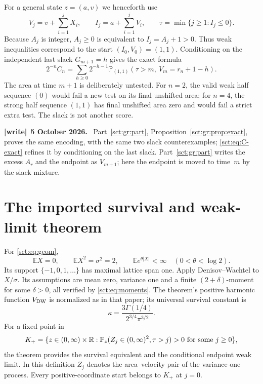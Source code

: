 \documentclass[11pt,letterpaper]{article}
\theoremstyle{definition}\newtheorem{remark}[theorem]{Remark}
\newcommand{\Pp}{\mathbb P}\newcommand{\Ee}{\mathbb E}
\newenvironment{writenote}[1][]{\par\smallskip\begingroup\small
 \noindent\textbf{[write]}\if\relax\detokenize{#1}\relax\else~\textbf{#1.}\fi\ }%
 {\par\endgroup\smallskip}
\begin{document}
For a general state $z=(a,v)$ we henceforth use
\begin{equation}\label{sct:eq:process}
 V_j=v+\sum_{i=1}^jX_i,\qquad
 I_j=a+\sum_{i=1}^jV_i,\qquad
 \tau=\min\{j\ge1:I_j\le0\}.
\end{equation}
Because $A_j$ is integer, $A_j\ge0$ is equivalent to $I_j=A_j+1>0$.
Thus weak inequalities correspond to the start $(I_0,V_0)=(1,1)$.
Conditioning on the independent last slack $G_{m+1}=h$ gives the exact formula
\begin{equation}\label{sct:eq:C-exact}
 2^{-n}C_n=\sum_{h\ge0}2^{-h-1}
 \Pp_{(1,1)}(\tau>m,\ V_m=r_n+1-h).
\end{equation}
The area at time $m+1$ is deliberately untested. For $n=2$, the valid weak
half sequence $(0)$ would fail a new test on its final unshifted area; for
$n=4$, the strong half sequence $(1,1)$ has final unshifted area zero and
would fail a strict extra test. The slack is not another score.
\begin{writenote}[5 October 2026]
Part~\ref{sct:gr:part}, Proposition~\ref{sct:gr:prop:exact}, proves the same encoding, with the same two slack counterexamples; \eqref{sct:eq:C-exact} refines it by conditioning on the last slack. Part~\ref{sct:gr:part} writes the excess $A_r$ and the endpoint as $V_{m+1}$; here the endpoint is moved to time~$m$ by the slack mixture.
\end{writenote}

\section{The imported survival and weak-limit theorem}\label{sct:sec:DW}
For \eqref{sct:eq:geom},
\begin{equation}\label{sct:eq:moments}
 \Ee X=0,\qquad \Ee X^2=\sigma^2=2,\qquad
 \Ee e^{\theta|X|}<\infty\quad(0<\theta<\log2).
\end{equation}
Its support $\{-1,0,1,\ldots\}$ has maximal lattice span one.
Apply Denisov--Wachtel \cite[Theorem 1, (7)--(8), pp.~169--170]{dw} to
$X/\sigma$. Its assumptions are mean zero, variance one and a finite
$(2+\delta)$-moment for some $\delta>0$, all verified by \eqref{sct:eq:moments}.
The theorem's positive harmonic function $V_{\mathrm{DW}}$ is normalized as in that paper;
its universal survival constant is
\begin{equation}\label{sct:eq:kappa}
 \kappa=\frac{3\Gamma(1/4)}{2^{3/4}\pi^{3/2}}.
\end{equation}
For a fixed point in
\[
 K_+=\{z\in(0,\infty)\times\R:
 \Pp_z(Z_j\in(0,\infty)^2,\tau>j)>0\text{ for some }j\ge0\},
\]
the theorem provides the survival equivalent and the conditional endpoint
weak limit. In this definition $Z_j$ denotes the area--velocity pair of the
variance-one process. Every positive-coordinate start belongs to $K_+$ at
$j=0$.
\end{document}
